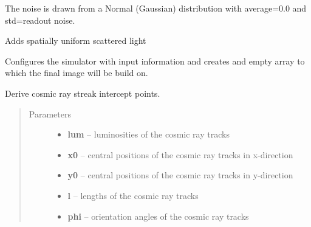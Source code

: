 \documentclass[a4paper,12pt,english]{sphinxmanual}
\begin{document}
\begin{fulllineitems}
\begin{fulllineitems}
The noise is drawn from a Normal (Gaussian) distribution with average=0.0 and std=readout noise.

\end{fulllineitems}


\begin{fulllineitems}
\label{simulator:simulator.simulator.VISsimulator.applyScatteredLight}
Adds spatially uniform scattered light

\end{fulllineitems}


\begin{fulllineitems}
\label{simulator:simulator.simulator.VISsimulator.configure}
Configures the simulator with input information and creates and empty array to which the final image will
be build on.

\end{fulllineitems}


\begin{fulllineitems}
\label{simulator:simulator.simulator.VISsimulator.cosmicRayIntercepts}
Derive cosmic ray streak intercept points.
\begin{quote}\begin{description}
\item[{Parameters}] \leavevmode\begin{itemize}
\item {} 
\textbf{lum} -- luminosities of the cosmic ray tracks

\item {} 
\textbf{x0} -- central positions of the cosmic ray tracks in x-direction

\item {} 
\textbf{y0} -- central positions of the cosmic ray tracks in y-direction

\item {} 
\textbf{l} -- lengths of the cosmic ray tracks

\item {} 
\textbf{phi} -- orientation angles of the cosmic ray tracks


\end{itemize}
\end{description}
\end{quote}
\end{fulllineitems}
\end{fulllineitems}
\end{document}
